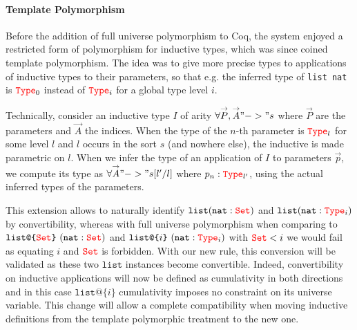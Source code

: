 \documentclass{easychair}
\newcommand{\Type}[1]{{\color{red} \mathtt{Type}}_{#1}}
\newcommand{\Set}{{\color{red} \mathtt{Set}}}
\begin{document}
\def\vec#1{\overset{\rightarrow}{#1}}
\def\clist{\texttt{list}}
\def\nat{\texttt{nat}}
\def\ulist#1{\texttt{list@\{}#1\texttt{\}}}
\paragraph{Template Polymorphism}

Before the addition of full universe polymorphism to Coq, the system
enjoyed a restricted form of polymorphism for inductive types, which was
since coined template polymorphism. The idea was to give more precise
types to applications of inductive types to their parameters, so that
e.g. the inferred type of \texttt{list nat} is $\Type{0}$ instead of
$\Type{i}$ for a global type level $i$.

Technically, consider an inductive type $I$ of arity
$\forall \vec{P}, \vec{A} "->" s$ where $\vec{P}$ are the parameters and
$\vec{A}$ the indices.  When the type of the $n$-th parameter is
$\Type{l}$ for some level $l$ and $l$ occurs in the sort $s$ (and
nowhere else), the inductive is made parametric on $l$. When we infer
the type of an application of $I$ to parameters $\vec{p}$, we compute
its type as $\forall \vec{A} "->" s[l'/l]$ where $p_n : \Type{l'}$,
using the actual inferred types of the parameters.

This extension allows to naturally identify $\clist (\nat : \Set)$ and
$\clist (\nat : \Type{i})$ by convertibility, whereas with full universe
polymorphism when comparing to $\ulist{\Set}~(\nat : \Set)$ and
$\ulist{i}~ (\nat : \Type{i})$ with $\Set < i$ we would fail as equating
$i$ and $\Set$ is forbidden. With our new rule, this conversion will be
validated as these two $\texttt{list}$ instances become convertible.
Indeed, convertibility on inductive applications will now be defined as
cumulativity in both directions and in this case $\ulist{i}$
cumulativity imposes no constraint on its universe variable. This change
will allow a complete compatibility when moving inductive definitions
from the template polymorphic treatment to the new one.
\end{document}

